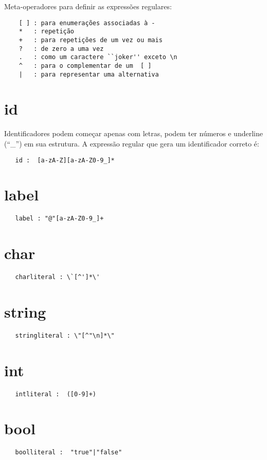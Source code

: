 Meta-operadores para definir as expressões regulares:
\begin{verbatim}
    [ ] : para enumerações associadas à -
    *   : repetição
    +   : para repetições de um vez ou mais
    ?   : de zero a uma vez
    .   : como um caractere ``joker'' exceto \n
    ^   : para o complementar de um  [ ]
    |   : para representar uma alternativa
\end{verbatim}

\section{id}
Identificadores podem começar apenas com letras, podem ter números e underline (``\_'') em sua estrutura.
A expressão regular que gera um identificador correto é:
 \begin{verbatim}
   id :  [a-zA-Z][a-zA-Z0-9_]*
\end{verbatim}

\section{label}
 \begin{verbatim}
   label : "@"[a-zA-Z0-9_]+
\end{verbatim}

\section{char}
\begin{verbatim}
   charliteral : \`[^']*\'
\end{verbatim}

\section{string}
\begin{verbatim}
   stringliteral : \"[^"\n]*\"
\end{verbatim}

\section{int}
\begin{verbatim}
   intliteral :  ([0-9]+)
\end{verbatim}

\section{bool}
\begin{verbatim}
   boolliteral :  "true"|"false"
\end{verbatim}

